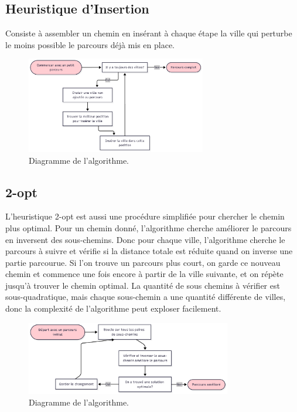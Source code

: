 \documentclass[a4paper,11pt,fleqn]{article}
\begin{document}
\subsection*{Heuristique d’Insertion}
Consiste à assembler un chemin en insérant à chaque étape la ville qui perturbe le moins possible le parcours déjà mis en place. 

\begin{figure}[H]
    \centering
    \includegraphics[width=0.7\textwidth]{images/charte-insert.png}
    \caption{Diagramme de l'algorithme.}
    \label{fig:charte-insert}
\end{figure}

\subsection*{2-opt}
L'heuristique 2-opt \cite{article:2opt} est aussi une procédure simplifiée pour chercher le chemin plus optimal. Pour un chemin donné, l'algorithme cherche améliorer le parcours en inversent des sous-chemins. Donc pour chaque ville, l'algorithme cherche le parcours à suivre et vérifie si la distance totale est réduite quand on inverse une partie parcourue. Si l'on trouve un parcours plus court, on garde ce nouveau chemin et commence une fois encore à partir de la ville suivante, et on répète jusqu'à trouver le chemin optimal. La quantité de sous chemins à vérifier est sous-quadratique, mais chaque sous-chemin a une quantité différente de villes, donc la complexité de l'algorithme peut exploser facilement.

\begin{figure}[H]
    \centering
    \includegraphics[width=0.8\textwidth]{images/chart-2opt.png}
    \caption{Diagramme de l'algorithme.}
    \label{fig:charte-2opt}
\end{figure}
\end{document}
